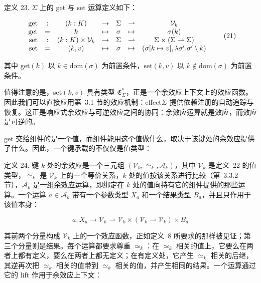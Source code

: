定义 23. \(\Sigma\) 上的 get 与 set 运算定义如下：

\[
\begin{array} { r c c c c c c } { \mathrm { g e t } } & { : } & { ( k : K ) } & { \to } & { \Sigma } & { \rightharpoonup } & { \mathcal { V } _ { k } } \\ { \mathrm { g e t } } & { = } & { k } & { \mapsto } & { \sigma } & { \mapsto } & { \sigma ( k ) } \\ { \mathrm { s e t } } & { : } & { ( k : K ) \times \mathcal { V } _ { k } } & { \to } & { \Sigma } & { \rightharpoonup } & { \Sigma \times ( \Sigma \rightharpoonup \Sigma ) } \\ { \mathrm { s e t } } & { = } & { ( k , v ) } & { \mapsto } & { \sigma } & { \mapsto } & { ( \sigma [ k \mapsto v ] , \lambda \sigma ^ { \prime } . \sigma ^ { \prime } \setminus k ) } \end{array}\tag{21}
\]

其中 get\(( k )\) 以 \(k \in \mathrm { d o m } ( \sigma )\) 为前置条件，set\(( k , v )\) 以 \(k \notin \mathrm { d o m } ( \sigma )\) 为前置条件。

值得注意的是，set\(( k , v )\) 具有类型 \(\mathfrak { E } _ { \Sigma } ^ { * }\)，正是一个余效应上下文上的效应函数。因此我们可以直接应用第~3.1 节的效应机制：effect\(\Sigma\) 提供依赖注册的自动追踪与恢复。这正是响应式余效应与可逆效应之间的协同：余效应运算就是效应，而效应是可逆的。

get 交给组件的是一个值，而组件能用这个值做什么，取决于该键处的余效应提供了什么。因此，一个键承载的不仅仅是值类型：

定义 24. 键 \(k\) 处的余效应是一个三元组 \(\left( \mathcal { V } _ { k } , \simeq _ { k } , \mathcal { A } _ { k } \right)\)，其中 \(\mathcal { V } _ { k }\) 是定义~22 的值类型，\(\simeq _ { k }\) 是 \(\mathcal { V } _ { k }\) 上的一个等价关系，\(k\) 处的值按该关系进行比较（第~3.3.2 节），\(\mathcal { A } _ { k }\) 是一组余效应运算，即绑定在 \(k\) 处的值向持有它的组件提供的那些运算。一个运算 \(a \in \mathcal { A } _ { k }\) 带有一个参数类型 \(X _ { a }\) 和一个结果类型 \(B _ { a }\)，并且只作用于该值本身：

\[
a : X _ { a } \to \mathcal { V } _ { k } \rightharpoonup \mathcal { V } _ { k } \times ( \mathcal { V } _ { k } \rightharpoonup \mathcal { V } _ { k } ) \times B _ { a }\tag{22}
\]

其前两个分量构成 \(\mathcal { V } _ { k }\) 上的一个效应函数，正如定义~8 所要求的那样被见证；第三个分量则是结果。每个运算都要求尊重 \(\simeq _ { k }\)：在 \(\simeq _ { k }\) 相关的值上，它要么在两者上都有定义，要么在两者上都无定义；在有定义处，它产生 \(\simeq _ { k }\) 相关的后继，其逆再次把 \(\simeq _ { k }\) 相关的值带到 \(\simeq _ { k }\) 相关的值，并产生相同的结果。一个运算通过它的 lift 作用于余效应上下文：

